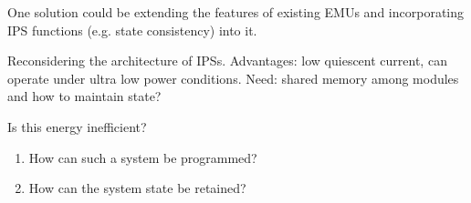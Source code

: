 One solution could be extending the features of existing EMUs and incorporating IPS functions (e.g. state consistency) into it. 

Reconsidering the architecture of IPSs.
Advantages: low quiescent current, can operate under ultra low power conditions.
Need: shared memory among modules and how to maintain state?


Is this energy inefficient?

\begin{enumerate}
    \item How can such a system be programmed?
    \item How can the system state be retained?
\end{enumerate}

